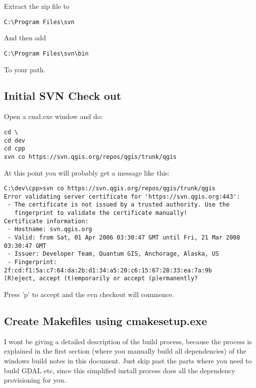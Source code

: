 
Extract the zip file to

\begin{verbatim}
C:\Program Files\svn
\end{verbatim}

And then add

\begin{verbatim}
C:\Program Files\svn\bin
\end{verbatim}

To your path.

\subsection{Initial SVN Check out}
Open a cmd.exe window and do:

\begin{verbatim}
cd \
cd dev
cd cpp
svn co https://svn.qgis.org/repos/qgis/trunk/qgis 
\end{verbatim}

At this point you will probably get a message like this:

\begin{verbatim}
C:\dev\cpp>svn co https://svn.qgis.org/repos/qgis/trunk/qgis
Error validating server certificate for 'https://svn.qgis.org:443':
 - The certificate is not issued by a trusted authority. Use the
   fingerprint to validate the certificate manually!
Certificate information:
 - Hostname: svn.qgis.org
 - Valid: from Sat, 01 Apr 2006 03:30:47 GMT until Fri, 21 Mar 2008 03:30:47 GMT
 - Issuer: Developer Team, Quantum GIS, Anchorage, Alaska, US
 - Fingerprint: 2f:cd:f1:5a:c7:64:da:2b:d1:34:a5:20:c6:15:67:28:33:ea:7a:9b
(R)eject, accept (t)emporarily or accept (p)ermanently?
\end{verbatim}

Press 'p' to accept and the svn checkout will commence.

\subsection{Create Makefiles using cmakesetup.exe}
I wont be giving a detailed description of the build process, because 
the process is explained in the first section (where you manually build 
all dependencies) of the windows build notes in this document. Just skip 
past the parts where you need to build GDAL etc, since this simplified 
install process does all the dependency provisioning for you.

